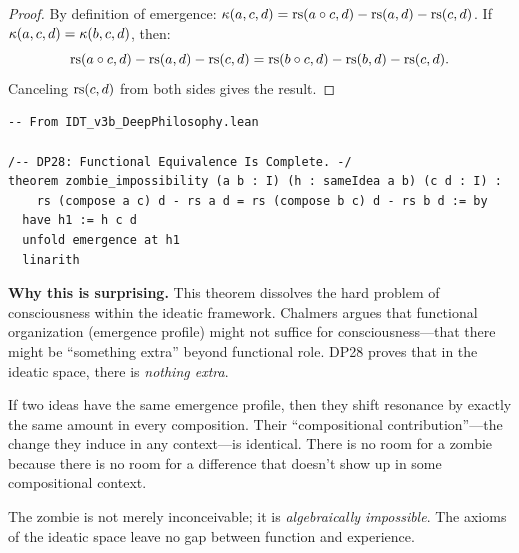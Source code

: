 \begin{proof}
By definition of emergence:
$\kappa(a, c, d) = \mathrm{rs}(a \circ c, d) - \mathrm{rs}(a, d) - \mathrm{rs}(c, d)$.
If $\kappa(a, c, d) = \kappa(b, c, d)$, then:
\[
\mathrm{rs}(a \circ c, d) - \mathrm{rs}(a, d) - \mathrm{rs}(c, d) =
\mathrm{rs}(b \circ c, d) - \mathrm{rs}(b, d) - \mathrm{rs}(c, d).
\]
Canceling $\mathrm{rs}(c, d)$ from both sides gives the result.
\end{proof}

\begin{lstlisting}
-- From IDT_v3b_DeepPhilosophy.lean

/-- DP28: Functional Equivalence Is Complete. -/
theorem zombie_impossibility (a b : I) (h : sameIdea a b) (c d : I) :
    rs (compose a c) d - rs a d = rs (compose b c) d - rs b d := by
  have h1 := h c d
  unfold emergence at h1
  linarith
\end{lstlisting}

\begin{surprisebox}
\noindent\textbf{Why this is surprising.}
This theorem dissolves the hard problem of consciousness within the
ideatic framework.  Chalmers argues that functional organization
(emergence profile) might not suffice for consciousness---that there
might be ``something extra'' beyond functional role.  DP28 proves that
in the ideatic space, there is \emph{nothing extra}.

If two ideas have the same emergence profile, then they shift
resonance by exactly the same amount in every composition.  Their
``compositional contribution''---the change they induce in any
context---is identical.  There is no room for a zombie because
there is no room for a difference that doesn't show up in some
compositional context.

The zombie is not merely inconceivable; it is \emph{algebraically
impossible}.  The axioms of the ideatic space leave no gap between
function and experience.
\end{surprisebox}

